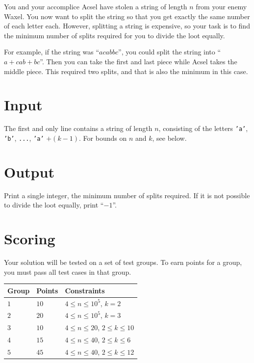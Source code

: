 You and your accomplice Acsel have stolen a string of length $n$ from your enemy Waxel. You now want to split the string so that you get
exactly the same number of each letter each. However, splitting a string is expensive, so your task is to find the minimum number of splits required for you to divide the loot equally.

For example, if the string was ``$\textit{acabbc}$'', you could split the string into
``$\textit{a}+\textit{cab}+\textit{bc}$''. Then you can take the first and last piece while Acsel takes the middle piece. This required two splits,
and that is also the minimum in this case.

\section*{Input}
The first and only line contains a string of length $n$, consisting of the letters \texttt{'a'}, \texttt{'b'}, \texttt{...}, \texttt{'a'} $+(k-1)$. For bounds on $n$ and $k$, see below.

\section*{Output}
Print a single integer, the minimum number of splits required. If it is not possible to divide the loot equally, print ``$-1$''.

\section*{Scoring}
Your solution will be tested on a set of test groups.
To earn points for a group, you must pass all test cases in that group.

\noindent
\begin{tabular}{| l | l | p{12cm} |}
  \hline
  Group & Points & Constraints \\ \hline
  $1$   & $10$       & $4 \le n \le 10^5$, $k = 2$ \\ \hline
  $2$   & $20$       & $4 \le n \le 10^5$, $k = 3$ \\ \hline
  $3$   & $10$       & $4 \le n \le 20$, $2 \leq k \leq 10$ \\ \hline
  $4$   & $15$       & $4 \le n \le 40$, $2 \leq k \leq 6$ \\ \hline
  $5$   & $45$       & $4 \le n \le 40$, $2 \leq k \leq 12$ \\ \hline
\end{tabular}
